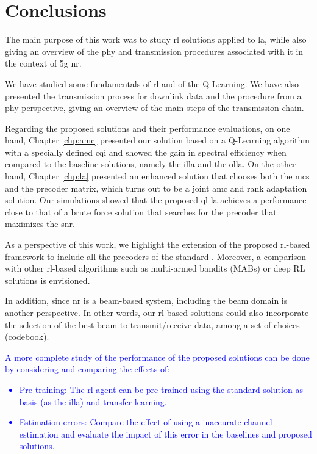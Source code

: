 \glsresetall
%

\chapter{Conclusions}%
\label{chp:conclusion}

The main purpose of this work was to study \gls{rl} solutions applied to \gls{la}, while also giving an overview of the \gls{phy} and transmission procedures associated with it in the context of \gls{5g} \gls{nr}.

We have studied some fundamentals of \gls{rl} and of the Q-Learning.
%
We have also presented the transmission process for downlink data and the procedure from a \gls{phy} perspective, giving an overview of the main steps of the transmission chain.

Regarding the proposed solutions and their performance evaluations, on one hand, Chapter \ref{chp:amc} presented our solution based on a Q-Learning algorithm with a specially defined \gls{cqi} and showed the gain in spectral efficiency when compared to the baseline solutions, namely the \gls{illa} and the \gls{olla}.
%
On the other hand, Chapter \ref{chp:la} presented an enhanced solution that chooses both the \gls{mcs} and the precoder matrix, which turns out to be a joint \gls{amc} and rank adaptation solution.
%
Our simulations showed that the proposed \gls{ql-la} achieves a performance close to that of a brute force solution that searches for the precoder that maximizes the \gls{snr}.

As a perspective of this work, we highlight the extension of the proposed \gls{rl}-based framework to include all the precoders of the standard \cite{3gpp.38.214}.
%
Moreover, a comparison with other \gls{rl}-based algorithms such as multi-armed bandits (MABs) \cite{zhou2015survey} or deep RL solutions \cite{DeepRLSurvey} is envisioned.

In addition, since \gls{nr} is a beam-based system, including the beam domain is another perspective.
%
In other words, our \gls{rl}-based solutions could also incorporate the selection of the best beam to transmit/receive data, among a set of choices (codebook).

\textcolor{blue}{
A more complete study of the performance of the proposed solutions can be done by considering and comparing the effects of:
\begin{itemize}
    \item Pre-training: The \gls{rl} agent can be pre-trained using the standard solution as basis (as the \gls{illa}) and transfer learning.
    \item Estimation errors: Compare the effect of using a inaccurate channel estimation and evaluate the impact of this error in the baselines and proposed solutions.
\end{itemize}
}
